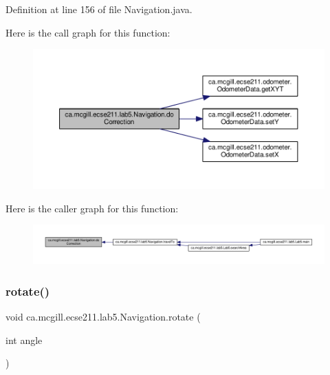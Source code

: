 Definition at line 156 of file Navigation.\+java.

Here is the call graph for this function\+:
\nopagebreak
\begin{figure}[H]
\begin{center}
\leavevmode
\includegraphics[width=350pt]{classca_1_1mcgill_1_1ecse211_1_1lab5_1_1_navigation_a73a89ddd822e0ba1cfd7a29c18aa7aea_cgraph}
\end{center}
\end{figure}
Here is the caller graph for this function\+:
\nopagebreak
\begin{figure}[H]
\begin{center}
\leavevmode
\includegraphics[width=350pt]{classca_1_1mcgill_1_1ecse211_1_1lab5_1_1_navigation_a73a89ddd822e0ba1cfd7a29c18aa7aea_icgraph}
\end{center}
\end{figure}
\mbox{\label{classca_1_1mcgill_1_1ecse211_1_1lab5_1_1_navigation_a5fcce0063a6b557d349a6fb5bf144c64}} 
\subsubsection{\texorpdfstring{rotate()}{rotate()}}
{\footnotesize\ttfamily void ca.\+mcgill.\+ecse211.\+lab5.\+Navigation.\+rotate (\begin{DoxyParamCaption}\item[{int}]{angle }\end{DoxyParamCaption})}

